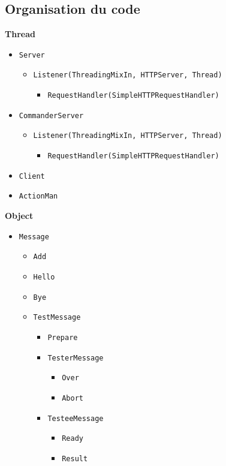 \documentclass[a4paper,11pt]{article}
\newcommand{\cd}[1]{\texttt{#1}}
\begin{document}
\begin{appendices}
\section{Organisation du code}

\textbf{Thread}
\begin{itemize}
\item \cd{Server}
	\begin{itemize}
	\item \cd{Listener(ThreadingMixIn, HTTPServer, Thread)}
		\begin{itemize}
		\item \cd{RequestHandler(SimpleHTTPRequestHandler)}
		\end{itemize}
	\end{itemize}

\item \cd{CommanderServer}
	\begin{itemize}
	\item \cd{Listener(ThreadingMixIn, HTTPServer, Thread)}
		\begin{itemize}
		\item \cd{RequestHandler(SimpleHTTPRequestHandler)}
		\end{itemize}
	\end{itemize}

\item \cd{Client}
\item \cd{ActionMan}
\end{itemize}



\textbf{Object}
\begin{itemize}
\item \cd{Message} 
	\begin{itemize}
	\item \cd{Add}
	\item \cd{Hello}
	\item \cd{Bye}
	\item \cd{TestMessage}
	\begin{itemize}
		\item \cd{Prepare}
		\item \cd{TesterMessage}
			\begin{itemize}
			\item \cd{Over}
			\item \cd{Abort}
			\end{itemize}
		\item \cd{TesteeMessage}
			\begin{itemize}
			\item \cd{Ready}
			\item \cd{Result}
			\end{itemize}
		\end{itemize}
	\end{itemize}


\end{itemize}
\end{appendices}
\end{document}

